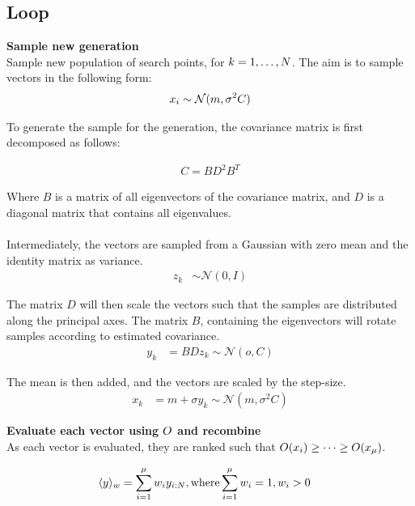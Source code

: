 \subsection{Loop}

\textbf{Sample new generation}\\
Sample new population of search points, for $k = 1, \dots, N$.
The aim is to sample vectors in the following form:
\begin{align*}
x_{i} \sim \mathcal{N}(m, \sigma^2 C)
\end{align*}


To generate the sample for the generation, the covariance matrix is first 
decomposed as follows:

\begin{align*}
C = B D^2 B^{T}
\end{align*}

Where $B$ is a matrix of all eigenvectors of the covariance matrix, and  $D$
is a diagonal matrix that contains all eigenvalues.\\
\\
Intermediately, the vectors are sampled from a Gaussian with zero mean and
the identity matrix as variance.
\begin{align*}
z_{k} &\sim \mathcal{N}(0, I)
\end{align*}

The matrix $D$ will then scale the vectors such that the samples
are distributed along the principal axes. The matrix $B$, containing 
the eigenvectors will rotate samples according to estimated covariance.
\begin{align*}
y_{k} &= BDz_{k} \sim \mathcal{N}(o, C)
\end{align*}

The mean is then added, and the vectors are scaled by the step-size.
\begin{align*}
x_{k} &= m + \sigma y_{k} \sim \mathcal{N}(m, \sigma^2 C)
\end{align*}



\textbf{Evaluate each vector using $O$ and recombine}\\
As each vector is evaluated, they are ranked such that 
$O{ \left( x_{i} \right) } \geq \dots \geq O{ \left( x_{\mu} \right)}$.

\begin{align*}
\langle y \rangle_{w} &= \sum^{\mu}_{i = 1}w_{i} y_{i : N}, \text{where} \sum^{\mu}_{i = 1} w_{i} = 1, w_{i} > 0
\end{align*}

